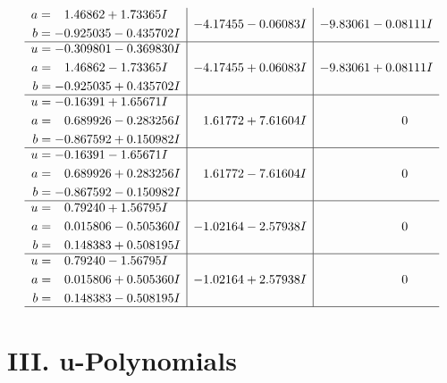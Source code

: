 \documentclass[1p]{elsarticle_modified}
\theoremstyle{definition}
\begin{document}
$$\begin{array}{c|c|c}
\begin{aligned}
a &= \phantom{-}1.46862 + 1.73365 I \\
b &= -0.925035 - 0.435702 I\end{aligned}
 & -4.17455 - 0.06083 I & -9.83061 - 0.08111 I \\ \hline\begin{aligned}
u &= -0.309801 - 0.369830 I \\
a &= \phantom{-}1.46862 - 1.73365 I \\
b &= -0.925035 + 0.435702 I\end{aligned}
 & -4.17455 + 0.06083 I & -9.83061 + 0.08111 I \\ \hline\begin{aligned}
u &= -0.16391 + 1.65671 I \\
a &= \phantom{-}0.689926 - 0.283256 I \\
b &= -0.867592 + 0.150982 I\end{aligned}
 & \phantom{-}1.61772 + 7.61604 I & \phantom{-0.000000 } 0 \\ \hline\begin{aligned}
u &= -0.16391 - 1.65671 I \\
a &= \phantom{-}0.689926 + 0.283256 I \\
b &= -0.867592 - 0.150982 I\end{aligned}
 & \phantom{-}1.61772 - 7.61604 I & \phantom{-0.000000 } 0 \\ \hline\begin{aligned}
u &= \phantom{-}0.79240 + 1.56795 I \\
a &= \phantom{-}0.015806 - 0.505360 I \\
b &= \phantom{-}0.148383 + 0.508195 I\end{aligned}
 & -1.02164 - 2.57938 I & \phantom{-0.000000 } 0 \\ \hline\begin{aligned}
u &= \phantom{-}0.79240 - 1.56795 I \\
a &= \phantom{-}0.015806 + 0.505360 I \\
b &= \phantom{-}0.148383 - 0.508195 I\end{aligned}
 & -1.02164 + 2.57938 I & \phantom{-0.000000 } 0\\
 \hline 
 \end{array}$$\newpage
\newpage\renewcommand{\arraystretch}{1}
\centering \section*{ III. u-Polynomials}
\end{document}
